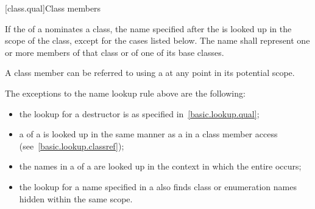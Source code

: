 [class.qual]{Class members}

\pnum
{}%
If the  of a 
nominates a class, the name specified after the
 is looked up in the scope of the
class, except for the cases listed below.
The name shall represent one or more members of that class or of one of
its base classes.
\begin{note}
A class member
can be referred to using a  at any point in its
potential scope.
\end{note}
The exceptions to
the name lookup rule above are the following:
\begin{itemize}
\item the lookup for a destructor is as specified
in~\ref{basic.lookup.qual};

\item a  of a
 is looked up
in the same manner as a  in a class member
access (see~\ref{basic.lookup.classref});

\item the names in a  of a
 are looked up in the context in which the entire
 occurs;

\item the lookup for a name specified in a
 also finds class or
enumeration names hidden within the same
scope.
\end{itemize}

